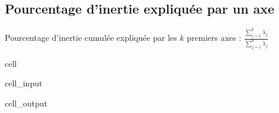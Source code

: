 \documentclass[letterpaper,10pt,english]{jupyterBook}
\begin{document}
\subsection{Pourcentage d’inertie expliquée par un axe}
\label{\detokenize{acp:pourcentage-d-inertie-expliquee-par-un-axe}}
\sphinxAtStartPar
Pourcentage d’inertie cumulée expliquée par les \(k\) premiers axes : \(\frac{\displaystyle\sum_{j=1}^k\lambda_j}{\displaystyle\sum_{j=1}^d\lambda_j}\)

\begin{sphinxuseclass}{cell}\begin{sphinxVerbatimInput}

\begin{sphinxuseclass}{cell_input}
\begin{sphinxVerbatim}[commandchars=\\\{\}]
  \PYG{p}{[}    \PYG{p}{]}
  
\end{sphinxVerbatim}

\end{sphinxuseclass}\end{sphinxVerbatimInput}
\begin{sphinxVerbatimOutput}

\begin{sphinxuseclass}{cell_output}
\noindent{}

\end{sphinxuseclass}\end{sphinxVerbatimOutput}

\end{sphinxuseclass}
\end{document}
